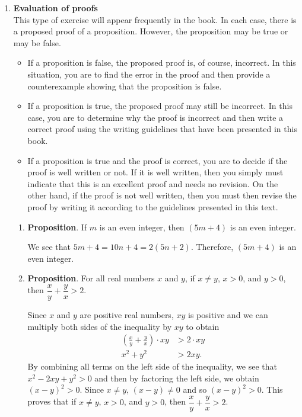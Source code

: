 \begin{enumerate}
  \item \textbf{Evaluation of proofs} \hfill \\
This type of exercise will appear frequently in the book.  In each case, there is a proposed proof of a proposition.  However, the proposition may be true or may be false. 
\label{exer:proofeval}%

\begin{itemize}
\item If a proposition is false, the proposed proof is, of course, incorrect.  In this situation, you are to find the error in the proof and then provide a counterexample showing that the proposition is false.

\item If a proposition is true, the proposed proof may still be incorrect.  In this case, you are to determine why the proof is incorrect and then write a correct proof using the writing guidelines that have been presented in this book.

\item If a proposition is true and the proof is correct, you are to decide if the proof is well written or not.  If it is well written, then you simply must indicate that this is an excellent proof and needs no revision.  On the other hand, if the proof is not well written, then you must then revise the proof by writing it according to the guidelines presented in this text.
\end{itemize}

\begin{enumerate}
\item \textbf{Proposition}. If $m$ is an even integer, then $\left(5m + 4\right)$ is an even integer.

\begin{myproof}
We see that $5m + 4 = 10n + 4 = 2 \left(5n + 2 \right)$.  Therefore, $\left(5m + 4 \right)$ is an even integer.
\end{myproof}


\item \textbf{Proposition}. For all real numbers $x$ and $y$, if $x \ne y$, $x > 0$, and $y >0$, then $\dfrac{x}{y} + \dfrac{y}{x} > 2$.

\begin{myproof}
Since $x$ and $y$ are positive real numbers, $xy$ is positive and we can multiply both sides of the inequality by $xy$ to obtain
\begin{align*}
\left( \frac{x}{y} + \frac{y}{x} \right) \cdot xy &> 2 \cdot xy \\
                                        x^2 + y^2 &> 2xy.
\end{align*}
By combining all terms on the left side of the inequality, we see that 
$x^2 - 2xy + y^2 > 0$ and then by factoring the left side, we obtain 
$\left( x - y \right)^2 > 0$.  Since $x \ne y$, $\left(x - y \right) \ne 0$ and so 
$\left( x - y \right)^2 > 0$.  This proves that if $x \ne y$, $x > 0$, and $y >0$, then 
$\dfrac{x}{y} + \dfrac{y}{x} > 2$.
\end{myproof}


\end{enumerate}
\end{enumerate}
